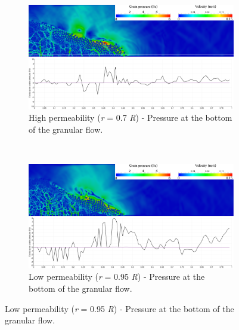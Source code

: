 \begin{figure}
\centering
\begin{subfigure}[t]{0.975\textwidth}
	\centering
    \includegraphics[width=\textwidth]{a08/r07_PWP_flow_dense}
    \caption{High permeability (\textit{r} = 0.7 \textit{R}) - Pressure at the 
    bottom of the granular flow.}
    \label{fig:r07_PWP_flow_dense}
\end{subfigure}
\\
\begin{subfigure}[t]{0.975\textwidth}
	\centering
    \includegraphics[width=\textwidth]{a08/r095_PWP_flow_dense}
    \caption{Low permeability (\textit{r} = 0.95 \textit{R}) - Pressure at the 
        bottom of the granular flow.}
    \label{fig:r095_PWP_flow_dense}
\end{subfigure}
\end{figure}
